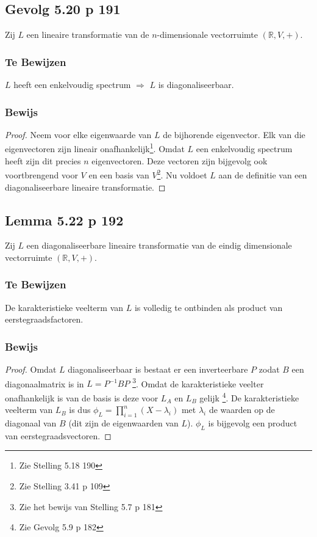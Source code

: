 \documentclass[lineaire_algebra_oplossingen.tex]{subfiles}
\begin{document}
\subsection{Gevolg 5.20 p 191}
Zij $L$ een lineaire transformatie van de $n$-dimensionale vectorruimte $(\mathbb{R},V,+)$.

\subsubsection*{Te Bewijzen}
\begin{center}
$L$ heeft een enkelvoudig spectrum $\Rightarrow$ $L$ is diagonaliseerbaar.
\end{center}

\subsubsection*{Bewijs}
\begin{proof}
Neem voor elke eigenwaarde van $L$ de bijhorende eigenvector. Elk van die eigenvectoren zijn lineair onafhankelijk\footnote{Zie Stelling 5.18 190}. Omdat $L$ een enkelvoudig spectrum heeft zijn dit precies $n$ eigenvectoren. Deze vectoren zijn bijgevolg ook voortbrengend voor $V$ en een basis van $V$\footnote{Zie Stelling 3.41 p 109}. Nu voldoet $L$ aan de definitie van een diagonaliseerbare lineaire transformatie.
\end{proof}


\subsection{Lemma 5.22 p 192}
Zij $L$ een diagonaliseerbare lineaire transformatie van de eindig dimensionale vectorruimte $(\mathbb{R},V,+)$.

\subsubsection*{Te Bewijzen}
De karakteristieke veelterm van $L$ is volledig te ontbinden als product van eerstegraadsfactoren.

\subsubsection*{Bewijs}
\begin{proof}
Omdat $L$ diagonaliseerbaar is bestaat er een inverteerbare $P$ zodat $B$ een diagonaalmatrix is in $L = P^{-1}BP$ \footnote{Zie het bewijs van Stelling 5.7 p 181}. Omdat de karakteristieke veelter onafhankelijk is van de basis is deze voor $L_A$ en $L_B$ gelijk \footnote{Zie Gevolg 5.9 p 182}. De karakteristieke veelterm van $L_B$ is dus $\phi_L = \prod_{i=1}^n(X-\lambda_i)$ met $\lambda_i$ de waarden op de diagonaal van $B$ (dit zijn de eigenwaarden van $L$).  $\phi_L$ is bijgevolg een product van eerstegraadsvectoren.
\end{proof}
\end{document}
